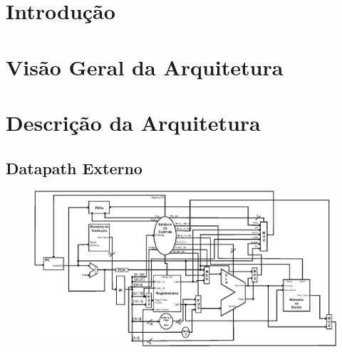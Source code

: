 \documentclass{report}
\begin{document}
\tableofcontents

\chapter{Introdução}
  
	

\chapter{Visão Geral da Arquitetura}

%	
	
	
	
	

\chapter{Descrição da Arquitetura}

	
	\newpage
	
	
	\newpage
	
		
	\newpage
	
	
	\newpage
	
	\begin{landscape}
	\section{Datapath Externo}
	\begin{figure}[H]
    	\includegraphics{./datapath/datapath_final-1.eps}
  	\end{figure}
  	\end{landscape}

% 
% 
\end{document}
